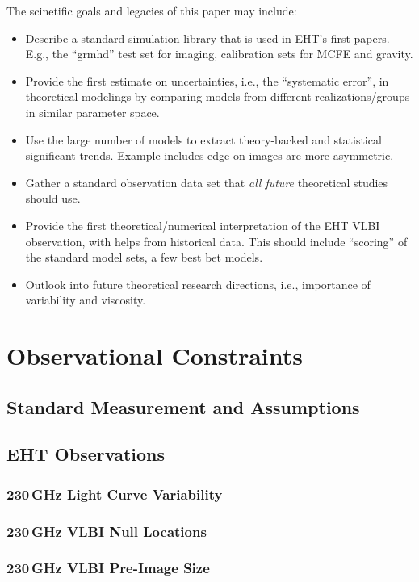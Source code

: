 \documentclass[twocolumn,twocolappendix,tighten,dvipsnames,linenumbers]{aastex63}
\begin{document}
The scinetific goals and legacies of this paper may include:
\begin{itemize}
\item Describe a standard simulation library that is used in EHT's
  first \sgra papers.
  E.g., the ``grmhd'' test set for imaging, calibration sets for MCFE
  and gravity.
\item Provide the first estimate on uncertainties, i.e., the
  ``systematic error'', in theoretical modelings by comparing models
  from different realizations/groups in similar parameter space.
\item Use the large number of models to extract theory-backed and
  statistical significant trends.
  Example includes edge on images are more asymmetric.
\item Gather a standard observation data set that \emph{all future}
  theoretical studies should use.
\item Provide the first theoretical/numerical interpretation of the
  EHT \sgra VLBI observation, with helps from historical data.
  This should include ``scoring'' of the standard model sets, a few
  best bet models.
\item Outlook into future theoretical research directions, i.e.,
  importance of variability and viscosity.
\end{itemize}

\section{Observational Constraints}

\subsection{Standard Measurement and Assumptions}

\subsection{EHT Observations}
\subsubsection{230\,GHz Light Curve Variability}
\subsubsection{230\,GHz VLBI Null Locations}
\subsubsection{230\,GHz VLBI Pre-Image Size}
\end{document}
